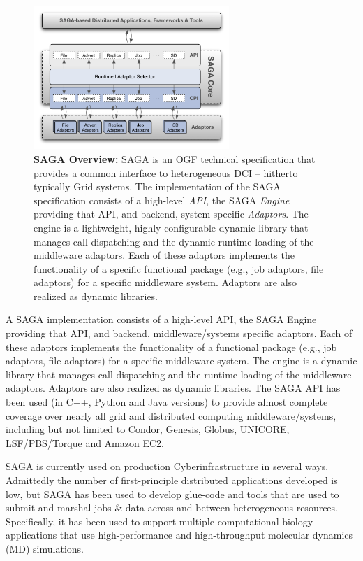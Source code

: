 \documentclass[]{svjour3}
\begin{document}
\begin{figure}[t]
  \centering \includegraphics[width=0.66\textwidth]{figures/saga-architecture-1.png}
\caption{\textbf{SAGA Overview: } SAGA is an OGF technical
 specification that provides a common interface to heterogeneous DCI
 -- hitherto typically Grid systems. The implementation of the
 SAGA\cite{saga_url} specification consists of a high-level {\it
  API}, the SAGA {\it Engine} providing that API, and backend,
 system-specific {\it Adaptors}. The engine is a lightweight,
 highly-configurable dynamic library that manages call dispatching
 and the dynamic runtime loading of the middleware adaptors. Each of
 these adaptors implements the functionality of a specific functional
 package (e.g., job adaptors, file adaptors) for a specific
 middleware system. Adaptors are also realized as dynamic libraries.}
 \label{fig:saga-overview}
\end{figure}

A SAGA implementation consists of a high-level API, the SAGA
Engine providing that API, and backend, middleware/systems specific
adaptors. Each of these adaptors implements the functionality of
a functional package (e.g., job adaptors, file adaptors) for a
specific middleware system. The engine is a dynamic library that
manages call dispatching and the runtime loading of the middleware
adaptors. Adaptors are also realized as dynamic libraries. The SAGA
API has been used (in C++, Python and Java versions) to provide almost
complete coverage over nearly all grid and distributed computing
middleware/systems, including but not limited to Condor, Genesis,
Globus, UNICORE, LSF/PBS/Torque and Amazon EC2.

SAGA is currently used on production Cyberinfrastructure in several ways.
Admittedly the number of first-principle distributed applications developed is
low, but SAGA has been used to develop glue-code and tools that are
used to submit and marshal jobs \& data across and between
heterogeneous resources. Specifically, it has been used to support
multiple computational biology applications that use high-performance
and high-throughput molecular dynamics (MD) simulations.
\end{document}
